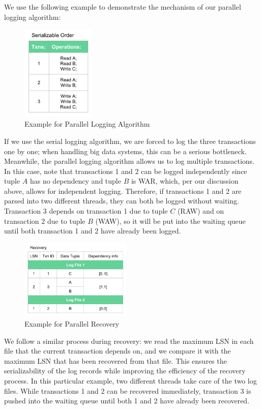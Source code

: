 We use the following example to demonstrate the mechanism of our parallel logging algorithm: 
\begin{figure}[!h]
\caption{Example for Parallel Logging Algorithm}
\centering
\includegraphics[width=100pt]{Parallel.png}
\end{figure}\par
If we use the serial logging algorithm, we are forced to log the three transactions one by one; when handling big data systems, this can be a serious bottleneck. Meanwhile, the parallel logging algorithm allows us to log multiple transactions. In this case, note that transactions 1 and 2 can be logged independently since tuple $A$ has no dependency and tuple $B$ is WAR, which, per our discussion above, allows for independent logging. Therefore, if transactions 1 and 2 are parsed into two different threads, they can both be logged without waiting. Transaction 3 depends on transaction 1 due to tuple $C$ (RAW) and on transaction 2 due to tuple $B$ (WAW), so it will be put into the waiting queue until both transaction 1 and 2 have already been logged. 
\begin{figure}[!h]
\caption{Example for Parallel Recovery}
\centering
\includegraphics[width=150pt]{Parallel_re.png}
\end{figure}\par
We follow a similar process during recovery: we read the maximum LSN in each file that the current transaction depends on, and we compare it with the maximum LSN that has been recovered from that file. This ensures the serializability of the log records while improving the efficiency of the recovery process. In this particular example, two different threads take care of the two log files. While transactions 1 and 2 can be recovered immediately, transaction 3 is pushed into the waiting queue until both 1 and 2 have already been recovered.\par